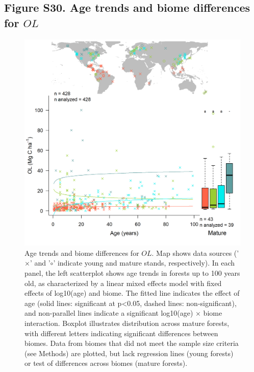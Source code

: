 \documentclass[
]{article}
\begin{document}
\newpage

\hypertarget{figure-s30.-age-trends-and-biome-differences-for-ol}{%
\subsection{\texorpdfstring{Figure S30. Age trends and biome differences
for
\(OL\)}{Figure S30. Age trends and biome differences for OL}}\label{figure-s30.-age-trends-and-biome-differences-for-ol}}

\begin{figure}[H]

{\centering \includegraphics[width=1\linewidth]{tables_figures/age_trends/organic_layer_with_map} 

}

\caption{Age trends and biome differences for $OL$. Map shows data sources ('$\times$' and '$\circ$' indicate young and mature stands, respectively). In each panel, the left scatterplot shows age trends in forests up to 100 years old, as characterized by a linear mixed effects model with fixed effects of log10(age) and biome. The fitted line indicates the effect of age (solid lines: significant at p<0.05, dashed lines: non-significant), and non-parallel lines indicate a significant log10(age) $\times$ biome interaction. Boxplot illustrates distribution across mature forests, with different letters indicating significant differences between biomes. Data from biomes that did not meet the sample size criteria (see Methods) are plotted, but lack regression lines (young forests) or test of differences across biomes (mature forests).}\label{fig:unnamed-chunk-33}
\end{figure}
\end{document}
